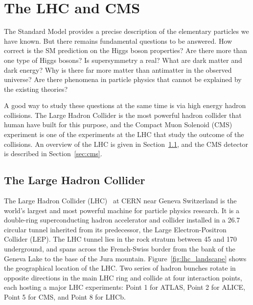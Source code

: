 \chapter{The LHC and CMS}

The Standard Model provides a precise description of the elementary particles we have known.
But there remains fundamental questions to be answered.
How correct is the SM prediction on the Higgs boson properties?
Are there more than one type of Higgs bosons?
Is supersymmetry a real?
What are dark matter and dark energy?
Why is there far more matter than antimatter in the observed universe?
Are there phenomena in particle physics that cannot be explained by the existing theories?

A good way to study these questions at the same time is via high energy hadron collisions.
The Large Hadron Collider is the most powerful hadron collider that human have built for this purpose,
and the Compact Muon Solenoid (CMS) experiment is one of the experiments at the LHC that study the outcome of the collisions. 
An overview of the LHC is given in Section~\ref{sec:lhc}, and the CMS detector is described in Section~\ref{sec:cms}.

\section{The Large Hadron Collider}\label{sec:lhc}

The Large Hadron Collider (LHC)~\cite{Evans_2008} at CERN near Geneva Switzerland is the world's largest and most powerful machine for particle physics research.
It is a double-ring superconducting hadron accelerator and collider installed in a 26.7 \km circular tunnel inherited from its predecessor, the Large Electron-Positron Collider (LEP).
The LHC tunnel lies in the rock stratum between 45 \meter and 170 \meter underground, 
and spans across the French-Swiss border from the bank of the Geneva Lake to the base of the Jura mountain.   
Figure~\ref{fig:lhc_landscape} shows the geographical location of the LHC. 
Two series of hadron bunches rotate in opposite directions in the main LHC ring and collide at four interaction points, 
each hosting a major LHC experiments: Point 1 for ATLAS, Point 2 for ALICE, Point 5 for CMS, and Point 8 for LHCb.


